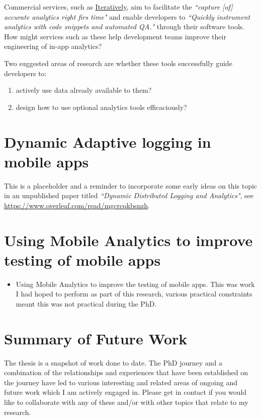 Commercial services, such as \href{http://iterative.ly}{Iteratively}, aim to facilitate the \emph{``capture [of] accurate analytics right firs time"} and enable developers to \emph{``Quickly instrument analytics with code snippets and automated QA."} through their software tools. How might services such as these help development teams improve their engineering of in-app analytics? 

Two suggested areas of research are whether these tools successfully guide developers to:
\begingroup
\renewcommand{\theenumi}{\alph{enumi}}
\begin{enumerate}
    \item actively use data already available to them?
    \item design how to use optional analytics tools efficaciously?
\end{enumerate}
\endgroup

\section{Dynamic Adaptive logging in mobile apps}
This is a placeholder and a reminder to incorporate some early ideas on this topic in an unpublished paper titled \emph{``Dynamic Distributed Logging and Analytics"}, see \url{https://www.overleaf.com/read/mgcrcqkbsnzh}.

\section{Using Mobile Analytics to improve testing of mobile apps}
\begin{itemize}
    \item Using Mobile Analytics to improve the testing of mobile apps. This was work I had hoped to perform as part of this research, various practical constraints meant this was not practical during the PhD.
\end{itemize}

\section{Summary of Future Work}
The thesis is a snapshot of work done to date. The PhD journey and a combination of the relationships and experiences that have been established on the journey have led to various interesting and related areas of ongoing and future work which I am actively engaged in. Please get in contact if you would like to collaborate with any of these and/or with other topics that relate to my research.
